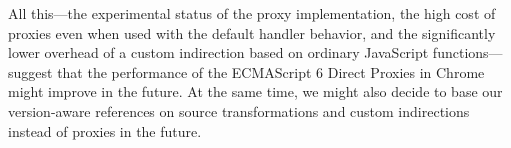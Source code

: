 All this---the experimental status of the proxy implementation, the high cost of proxies even when used with the default handler behavior, and the significantly lower overhead of a custom indirection based on ordinary JavaScript functions---suggest that the performance of the ECMAScript 6 Direct Proxies in Chrome might improve in the future.
At the same time, we might also decide to base our version-aware references on source transformations and custom indirections instead of proxies in the future.



% 


